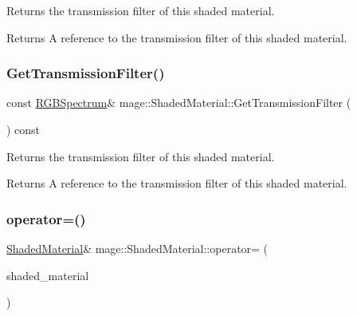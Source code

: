 Returns the transmission filter of this shaded material.

\begin{DoxyReturn}{Returns}
A reference to the transmission filter of this shaded material. 
\end{DoxyReturn}
\hypertarget{structmage_1_1_shaded_material_ac1735260a6d52bacbaea76594f7fbfdb}{}\label{structmage_1_1_shaded_material_ac1735260a6d52bacbaea76594f7fbfdb} 
\subsubsection{\texorpdfstring{Get\+Transmission\+Filter()}{GetTransmissionFilter()}\hspace{0.1cm}{\footnotesize\ttfamily [2/2]}}
{\footnotesize\ttfamily const \hyperlink{structmage_1_1_r_g_b_spectrum}{R\+G\+B\+Spectrum}\& mage\+::\+Shaded\+Material\+::\+Get\+Transmission\+Filter (\begin{DoxyParamCaption}{ }\end{DoxyParamCaption}) const\hspace{0.3cm}{\ttfamily [noexcept]}}

Returns the transmission filter of this shaded material.

\begin{DoxyReturn}{Returns}
A reference to the transmission filter of this shaded material. 
\end{DoxyReturn}
\hypertarget{structmage_1_1_shaded_material_ade9ec3ee6aae198e695240a5b89a0d72}{}\label{structmage_1_1_shaded_material_ade9ec3ee6aae198e695240a5b89a0d72} 
\subsubsection{\texorpdfstring{operator=()}{operator=()}\hspace{0.1cm}{\footnotesize\ttfamily [1/2]}}
{\footnotesize\ttfamily \hyperlink{structmage_1_1_shaded_material}{Shaded\+Material}\& mage\+::\+Shaded\+Material\+::operator= (\begin{DoxyParamCaption}\item[{const \hyperlink{structmage_1_1_shaded_material}{Shaded\+Material} \&}]{shaded\+\_\+material }\end{DoxyParamCaption})\hspace{0.3cm}{\ttfamily [default]}}

